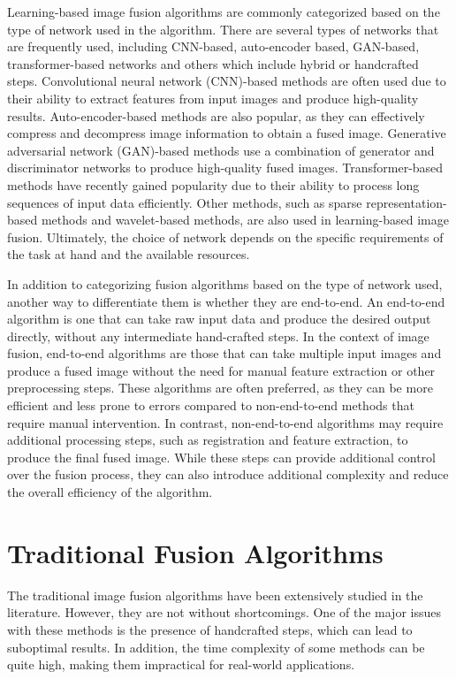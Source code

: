 Learning-based image fusion algorithms are commonly categorized based on the type of network used in the algorithm. There are several types of networks that are frequently used, including CNN-based, auto-encoder based, GAN-based, transformer-based networks and others which include hybrid or handcrafted steps. Convolutional neural network (CNN)-based methods are often used due to their ability to extract features from input images and produce high-quality results. Auto-encoder-based methods are also popular, as they can effectively compress and decompress image information to obtain a fused image. Generative adversarial network (GAN)-based methods use a combination of generator and discriminator networks to produce high-quality fused images. Transformer-based methods have recently gained popularity due to their ability to process long sequences of input data efficiently. Other methods, such as sparse representation-based methods and wavelet-based methods, are also used in learning-based image fusion. Ultimately, the choice of network depends on the specific requirements of the task at hand and the available resources.

In addition to categorizing fusion algorithms based on the type of network used, another way to differentiate them is whether they are end-to-end. An end-to-end algorithm is one that can take raw input data and produce the desired output directly, without any intermediate hand-crafted steps. In the context of image fusion, end-to-end algorithms are those that can take multiple input images and produce a fused image without the need for manual feature extraction or other preprocessing steps. These algorithms are often preferred, as they can be more efficient and less prone to errors compared to non-end-to-end methods that require manual intervention. In contrast, non-end-to-end algorithms may require additional processing steps, such as registration and feature extraction, to produce the final fused image. While these steps can provide additional control over the fusion process, they can also introduce additional complexity and reduce the overall efficiency of the algorithm.

\section{Traditional Fusion Algorithms}

The traditional image fusion algorithms have been extensively studied in the literature. However, they are not without shortcomings. One of the major issues with these methods is the presence of handcrafted steps, which can lead to suboptimal results. In addition, the time complexity of some methods can be quite high, making them impractical for real-world applications.


